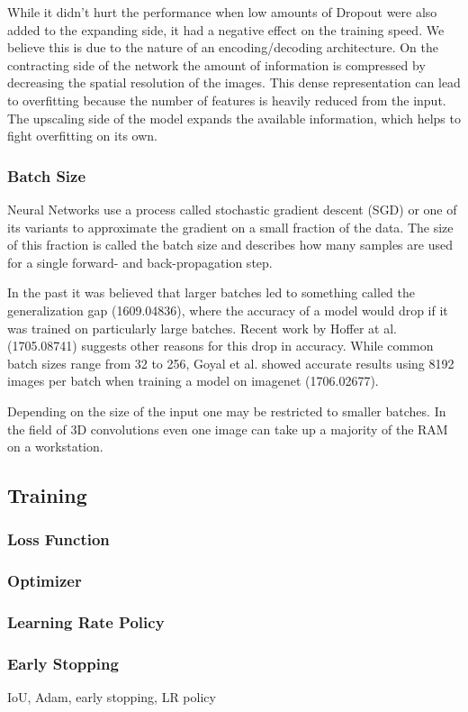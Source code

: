 While it didn't hurt the performance when low amounts of Dropout were also added to the expanding side, it had a negative effect on the training speed. We believe this is due to the nature of an encoding/decoding architecture. On the contracting side of the network the amount of information is compressed by decreasing the spatial resolution of the images. This dense representation can lead to overfitting because the number of features is heavily reduced from the input. The upscaling side of the model expands the available information, which helps to fight overfitting on its own.


\subsubsection{Batch Size}

Neural Networks use a process called stochastic gradient descent (SGD) or one of its variants to approximate the gradient on a small fraction of the data. The size of this fraction is called the batch size and describes how many samples are used for a single forward- and back-propagation step.

In the past it was believed that larger batches led to something called the generalization gap (1609.04836), where the accuracy of a model would drop if it was trained on particularly large batches. Recent work by Hoffer at al. (1705.08741) suggests other reasons for this drop in accuracy. While common batch sizes range from 32 to 256, Goyal et al. showed accurate results using 8192 images per batch when training a model on imagenet (1706.02677).

Depending on the size of the input one may be restricted to smaller batches. In the field of 3D convolutions even one image can take up a majority of the RAM on a workstation.

\subsection{Training}

\subsubsection{Loss Function}

\subsubsection{Optimizer}

\subsubsection{Learning Rate Policy}

\subsubsection{Early Stopping}

IoU, Adam, early stopping, LR policy

\newpage
